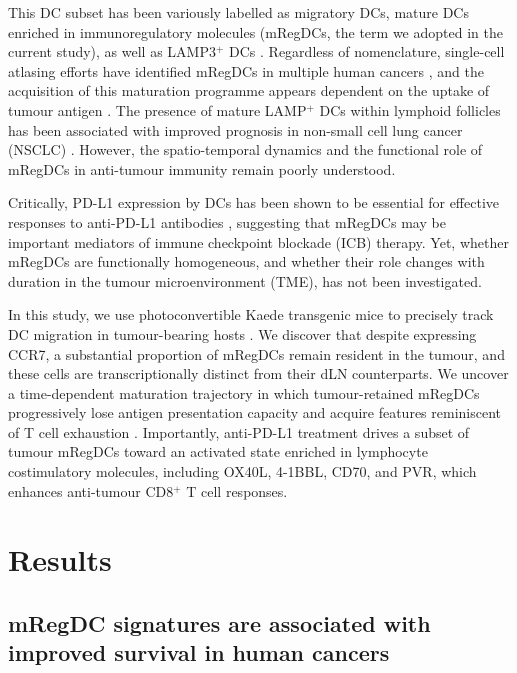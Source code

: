 \documentclass[11pt]{article}
\begin{document}
This DC subset has been variously labelled as migratory DCs, mature DCs enriched in immunoregulatory molecules (mRegDCs, the term we adopted in the current study), as well as LAMP3$^+$ DCs \citep{nieto2022}. Regardless of nomenclature, single-cell atlasing efforts have identified mRegDCs in multiple human cancers \citep{gerhard2021, cheng2021, zilionis2019}, and the acquisition of this maturation programme appears dependent on the uptake of tumour antigen \citep{maier2020}. The presence of mature LAMP$^+$ DCs within lymphoid follicles has been associated with improved prognosis in non-small cell lung cancer (NSCLC) \citep{dieu2004, dieu2008, ladanyi2014}. However, the spatio-temporal dynamics and the functional role of mRegDCs in anti-tumour immunity remain poorly understood.

Critically, PD-L1 expression by DCs has been shown to be essential for effective responses to anti-PD-L1 antibodies \citep{peng2020, oh2020}, suggesting that mRegDCs may be important mediators of immune checkpoint blockade (ICB) therapy. Yet, whether mRegDCs are functionally homogeneous, and whether their role changes with duration in the tumour microenvironment (TME), has not been investigated.

In this study, we use photoconvertible Kaede transgenic mice to precisely track DC migration in tumour-bearing hosts \citep{tomura2008, galvez2023}. We discover that despite expressing CCR7, a substantial proportion of mRegDCs remain resident in the tumour, and these cells are transcriptionally distinct from their dLN counterparts. We uncover a time-dependent maturation trajectory in which tumour-retained mRegDCs progressively lose antigen presentation capacity and acquire features reminiscent of T cell exhaustion \citep{wherry2011}. Importantly, anti-PD-L1 treatment drives a subset of tumour mRegDCs toward an activated state enriched in lymphocyte costimulatory molecules, including OX40L, 4-1BBL, CD70, and PVR, which enhances anti-tumour CD8$^+$ T cell responses.

\section{Results}

\subsection{mRegDC signatures are associated with improved survival in human cancers}
\end{document}
